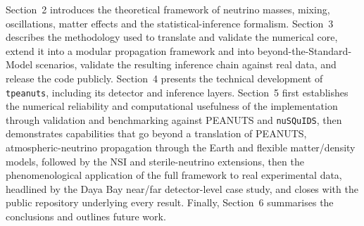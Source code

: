 Section~2 introduces the theoretical framework of neutrino masses, mixing, oscillations, matter effects and the statistical-inference formalism. Section~3 describes the methodology used to translate and validate the numerical core, extend it into a modular propagation framework and into beyond-the-Standard-Model scenarios, validate the resulting inference chain against real data, and release the code publicly. Section~4 presents the technical development of \texttt{tpeanuts}, including its detector and inference layers. Section~5 first establishes the numerical reliability and computational usefulness of the implementation through validation and benchmarking against PEANUTS and \texttt{nuSQuIDS}, then demonstrates capabilities that go beyond a translation of PEANUTS, atmospheric-neutrino propagation through the Earth and flexible matter/density models, followed by the NSI and sterile-neutrino extensions, then the phenomenological application of the full framework to real experimental data, headlined by the Daya Bay near/far detector-level case study, and closes with the public repository underlying every result. Finally, Section~6 summarises the conclusions and outlines future work.
